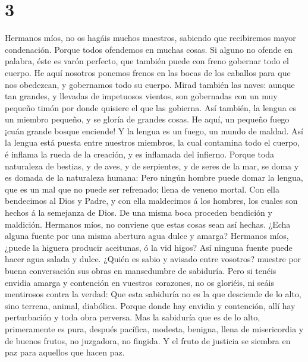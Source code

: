 \hypertarget{section-2}{%
\section{3}\label{section-2}}

 Hermanos míos, no os hagáis muchos maestros, sabiendo que
recibiremos mayor condenación.  Porque todos ofendemos en
muchas cosas. Si alguno no ofende en palabra, éste es varón perfecto,
que también puede con freno gobernar todo el cuerpo.  He
aquí nosotros ponemos frenos en las bocas de los caballos para que nos
obedezcan, y gobernamos todo su cuerpo.  Mirad también las
naves: aunque tan grandes, y llevadas de impetuosos vientos, son
gobernadas con un muy pequeño timón por donde quisiere el que las
gobierna.  Así también, la lengua es un miembro pequeño, y
se gloría de grandes cosas. He aquí, un pequeño fuego ¡cuán grande
bosque enciende!  Y la lengua es un fuego, un mundo de
maldad. Así la lengua está puesta entre nuestros miembros, la cual
contamina todo el cuerpo, é inflama la rueda de la creación, y es
inflamada del infierno.  Porque toda naturaleza de
bestias, y de aves, y de serpientes, y de seres de la mar, se doma y es
domada de la naturaleza humana:  Pero ningún hombre puede
domar la lengua, que es un mal que no puede ser refrenado; llena de
veneno mortal.  Con ella bendecimos al Dios y Padre, y con
ella maldecimos á los hombres, los cuales son hechos á la semejanza de
Dios.  De una misma boca proceden bendición y maldición.
Hermanos míos, no conviene que estas cosas sean así hechas.
 ¿Echa alguna fuente por una misma abertura agua dulce y
amarga?  Hermanos míos, ¿puede la higuera producir
aceitunas, ó la vid higos? Así ninguna fuente puede hacer agua salada y
dulce.  ¿Quién es sabio y avisado entre vosotros? muestre
por buena conversación sus obras en mansedumbre de sabiduría.
 Pero si tenéis envidia amarga y contención en vuestros
corazones, no os gloriéis, ni seáis mentirosos contra la verdad:
 Que esta sabiduría no es la que desciende de lo alto,
sino terrena, animal, diabólica.  Porque donde hay
envidia y contención, allí hay perturbación y toda obra perversa.
 Mas la sabiduría que es de lo alto, primeramente es
pura, después pacífica, modesta, benigna, llena de misericordia y de
buenos frutos, no juzgadora, no fingida.  Y el fruto de
justicia se siembra en paz para aquellos que hacen paz.

